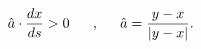 \begin{equation}
\hat{a}\cdot\frac{dx}{ds}>0 \makebox[.5in]{,} \hat{a}=\frac{y-x}{|y-x|}.
\label{strings}
\end{equation}


